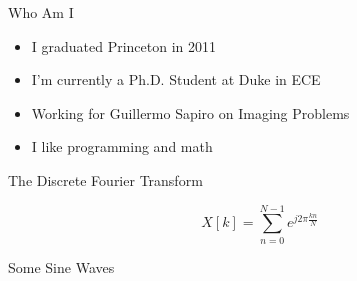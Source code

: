 \documentclass{beamer}
\title[Sample Meeting]{}
\author{Chris Tralie}
\institute{Duke University}
\begin{document}
\begin{frame}{Who Am I}

\begin{itemize}[label=$\blacktriangleright$]

\item I graduated Princeton in 2011

\item I'm currently a Ph.D. Student at Duke in ECE

\item Working for Guillermo Sapiro on Imaging Problems

\item I like programming and math

\end{itemize}

\end{frame}


\begin{frame}{The Discrete Fourier Transform}

\[ X[k] = \sum_{n = 0}^{N-1} e^{j 2 \pi \frac{kn}{N}} \]

\end{frame}


\begin{frame}{Some Sine Waves}

\begin{figure}[t]
\centering
{}
\label{fig:sines}
\end{figure}


\end{frame}
\end{document}
